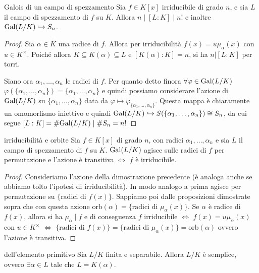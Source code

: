 \begin{theorem}{Galois di un campo di spezzamento}
    Sia $f \in K[x]$ irriducibile di grado $n$, e sia $L$ il campo di spezzamento di $f$ su $K$. Allora $n \mid [L:K] \mid n!$ e inoltre $\text{Gal}(L/K) \hookrightarrow S_n$.
\end{theorem}
\begin{proof}
    Sia $\alpha \in \overline{K}$ una radice di $f$. Allora per irriducibilità $f(x) = u \mu_{\alpha}(x)$ con $u \in K^\times$. Poiché allora $K \subseteq K(\alpha) \subseteq L$ e $[K(\alpha) : K] = n$, si ha $n | [L:K]$ per torri.

    Siano ora $\alpha_1,\dots,\alpha_n$ le radici di $f$. Per quanto detto finora $\forall \varphi \in \text{Gal}(L/K)$  $\varphi(\{\alpha_1,\dots,\alpha_n\}) = \{\alpha_1,\dots,\alpha_n\}$ e quindi possiamo considerare l'azione di $\text{Gal}(L/K)$ su $\{\alpha_1,\dots,\alpha_n\}$ data da $\varphi \mapsto \varphi_{\{\alpha_1,\dots,\alpha_n\}}$. Questa mappa è chiaramente un omomorfismo iniettivo e quindi $\text{Gal}(L/K) \hookrightarrow S(\{\alpha_1,\dots,\alpha_n\}) \cong S_n$, da cui segue $[L:K] = \#\text{Gal}(L/K) \mid \#S_n = n!$
\end{proof}
\begin{proposition}{irriducibilità e orbite}
    Sia $f \in K[x]$ di grado $n$, con radici $\alpha_1,\dots,\alpha_n$ e sia $L$ il campo di spezzamento di $f$ su $K$. $\text{Gal}(L/K)$ agisce sulle radici di $f$ per permutazione e l'azione è transitiva $\iff$ $f$ è irriducibile.
\end{proposition}
\begin{proof}
    Consideriamo l'azione della dimostrazione precedente (è analoga anche se abbiamo tolto l'ipotesi di irriducibilità). In modo analogo a prima agisce per permutazione su $\{ \text{radici di } f(x)\}$. Sappiamo poi dalle proposizioni dimostrate sopra che con questa azione $\text{orb}(\alpha) = \{ \text{radici di } \mu_{\alpha}(x)\}$. Se $\alpha$ è radice di $f(x)$, allora si ha $\mu_{\alpha} \mid f$ e di conseguenza $f$ irriducibile $\iff$ $f(x) = u\mu_{\alpha}(x)$ con $u \in K^\times$ $\iff$ $\{ \text{radici di } f(x)\} =  \{ \text{radici di } \mu_{\alpha}(x)\} =\text{orb}(\alpha)$ ovvero l'azione è transitiva.
\end{proof}
\begin{theorem}{dell'elemento primitivo}
        Sia $L/K$ finita e separabile. Allora $L/K$ è semplice, ovvero $\exists \alpha \in L$ tale che $L = K(\alpha)$. 
\end{theorem}
